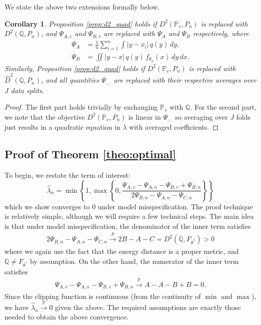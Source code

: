 \documentclass[11pt,a4paper]{article}
\theoremstyle{plain}
\newtheorem{corollary}{Corollary}
\theoremstyle{remark}
\theoremstyle{remark}
\begin{document}
 We state the above two extensions formally below.
 \begin{corollary}\label{cor:lambda_cv}
Proposition \ref{prop:d2_quad} holds if  $D^2(\mathbb{P}_v,P_n)$ is replaced with $D^2(\mathbb{Q},P_n)$, and $\Psi_{A,v}$ and $\Psi_{B,v}$ are replaced with $\Psi_A$ and $\Psi_B$ respectively, where
\begin{align*}
    \Psi_{A} &= \frac{1}{n}\sum_{i = 1}^n \int |y - x_i| \, q(y)\, dy,\\
    \Psi_B &= \iint |y - x| \, q(y)\, f_{\theta_n}(x)\, dy\, dx.
\end{align*}
Similarly, Proposition \ref{prop:d2_quad} holds if  $D^2(\mathbb{P}_v,P_n)$ is replaced with $ \widehat{D}^2(\mathbb{Q},P_n)$, and all quantities $\Psi_{\cdot,\cdot}$ are replaced with their respective averages over $J$ data splits.
 \end{corollary}
 \begin{proof}
     The first part holds trivially by exchanging $\mathbb{P}_v$ with $\mathbb{Q}$. For the second part, we note that the objective $D^2(\mathbb{P}_v,P_n)$ is linear in $\Psi_{\cdot, \cdot}$ so averaging over $J$ folds just results in a quadratic equation in $\lambda$ with averaged coefficients.
 \end{proof}



\subsection{Proof of Theorem \ref{theo:optimal}}
To begin, we restate the term of interest:
$$ \widehat{\lambda}_n=\min\left\{1,\max\left\{0,\dfrac{\Psi_{A,v} -\Psi_{A,n}-\Psi_{B,v}+ \Psi_{B,n}}{2\Psi_{B,n}-\Psi_{A,n}-\Psi_{C,n}}\right\}\right\}$$
which we show converges to 0 under model misspecification. The proof technique is relatively simple, although we will require a few technical steps. The main idea is that under model misspecification, the denominator of the inner term satisfies
\begin{align*}
 2\Psi_{B,n}-\Psi_{A,n}-\Psi_{C,n} \overset{p}{\to} 2B  -A -C = D^2\left(\mathbb{Q}, F_{\theta^*}\right) > 0
\end{align*}
where we again use the fact that the energy distance is a proper metric, and $\mathbb{Q} \neq F_{\theta^*}$ by assumption.
On the other hand, the numerator of the inner term satisfies
\begin{align*}
    \Psi_{A,v} -\Psi_{A,n}-\Psi_{B,v}+ \Psi_{B,n} \overset{p}{\to} A - A - B + B = 0.
\end{align*}
Since the clipping function is continuous (from the continuity of $\min$ and $\max$), we have $\widehat{\lambda}_n \overset{p}{\to} 0$ given the above. The required assumptions are exactly those needed to obtain the above convergence. 
\end{document}
